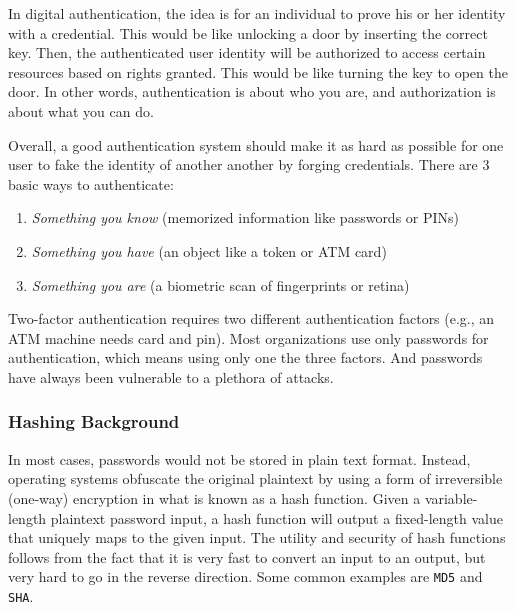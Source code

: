 In digital authentication, the idea is for an individual to prove his or her identity with a credential. This would be like unlocking a door by inserting the correct key. Then, the authenticated user identity will be authorized to access certain resources based on rights granted. This would be like turning the key to open the door. In other words, authentication is about who you are, and authorization is about what you can do.

Overall, a good authentication system should make it as hard as possible for one user to fake the identity of another another by forging credentials. There are 3 basic ways to authenticate:
\begin{enumerate}
  \item \textit{Something you know} (memorized information like passwords or PINs)
  \item \textit{Something you have} (an object like a token or ATM card)
  \item \textit{Something you are} (a biometric scan of fingerprints or retina)
\end{enumerate}
Two-factor authentication requires two different authentication factors (e.g., an ATM machine needs card and pin). Most organizations use only passwords for authentication, which means using only one the three factors. And passwords have always been vulnerable to a plethora of attacks.

\subsubsection{Hashing Background}
In most cases, passwords would not be stored in plain text format. Instead, operating systems obfuscate the original plaintext by using a form of irreversible (one-way) encryption in what is known as a hash function. Given a variable-length plaintext password input, a hash function will output a fixed-length value that uniquely maps to the given input. The utility and security of hash functions follows from the fact that it is very fast to convert an input to an output, but very hard to go in the reverse direction. Some common examples are \verb|MD5| and \verb|SHA|.

